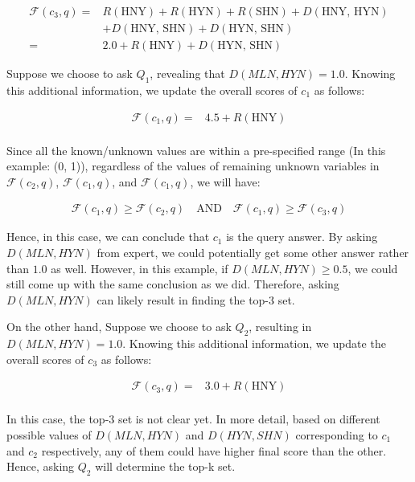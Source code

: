 \begin{example}
\[
\begin{aligned}
    \mathcal{F}(c_3, q) = 
    & R(\text{HNY}) + R(\text{HYN}) + R(\text{SHN}) + D(\text{HNY, HYN}) \\
    & + D(\text{HNY, SHN}) + D(\text{HYN, SHN}) \\
    = & 2.0 + R(\text{HNY}) + D(\text{HYN, SHN}) 
\end{aligned}
\]



    
    Suppose we choose to ask \( Q_1 \), revealing that \(D(MLN, HYN) = 1.0 \). Knowing this additional information, we update the overall scores of \( c_1 \) as follows:
    
\[
\begin{aligned}
    \mathcal{F}(c_1, q) = 
     & 4.5 + R(\text{HNY}) \\
\end{aligned}
\]

    Since all the known/unknown values are within a pre-specified range (In this example: (0, 1)), regardless of the values of remaining unknown variables in $\mathcal{F}(c_2, q)$, $\mathcal{F}(c_1, q)$, and $\mathcal{F}(c_1, q)$, we will have:

    \[
\begin{aligned}
    \mathcal{F}(c_1, q) \geq \mathcal{F}(c_2, q) \quad \text{AND} \quad
    \mathcal{F}(c_1, q) \geq \mathcal{F}(c_3, q)
\end{aligned}
\]

    Hence, in this case, we can conclude that $c_1$ is the query answer. By asking \(D(MLN, HYN)\) from expert, we could potentially get some other answer rather than $1.0$ as well. However, in this example, if \(D(MLN, HYN) \geq 0.5 \), we could still come up with the same conclusion as we did. Therefore, asking \(D(MLN, HYN)\) can likely result in finding the top-3 set.  

    On the other hand, Suppose we choose to ask \( Q_2 \), resulting in \(D(MLN, HYN) = 1.0 \). Knowing this additional information, we update the overall scores of \( c_3 \) as follows:
    
    \[
    \begin{aligned}
        \mathcal{F}(c_3, q) = 
         & 3.0 + R(\text{HNY}) \\
    \end{aligned}
    \]

    In this case, the top-3 set is not clear yet. In more detail, based on different possible values of $D(MLN, HYN)$ and $D(HYN, SHN)$ corresponding to $c_1$ and $c_2$ respectively, any of them could have higher final score than the other. Hence, asking $Q_2$ will determine the top-k set. 


\end{example}
